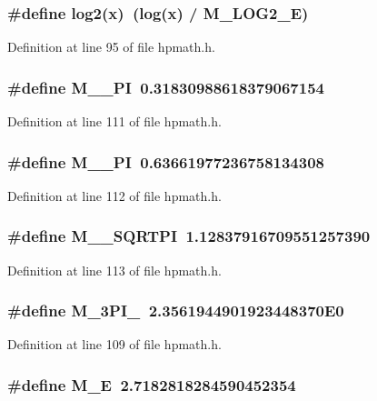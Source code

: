 \subsubsection{\setlength{\rightskip}{0pt plus 5cm}\#define log2(x)\ (log(x) / M\_\-LOG2\_\-E)}\label{hpmath_8h_a8}




Definition at line 95 of file hpmath.h.
\subsubsection{\setlength{\rightskip}{0pt plus 5cm}\#define M\_\_\-PI\ 0.31830988618379067154}\label{hpmath_8h_a21}




Definition at line 111 of file hpmath.h.
\subsubsection{\setlength{\rightskip}{0pt plus 5cm}\#define M\_\_\-PI\ 0.63661977236758134308}\label{hpmath_8h_a22}




Definition at line 112 of file hpmath.h.
\subsubsection{\setlength{\rightskip}{0pt plus 5cm}\#define M\_\_\-SQRTPI\ 1.12837916709551257390}\label{hpmath_8h_a23}




Definition at line 113 of file hpmath.h.
\subsubsection{\setlength{\rightskip}{0pt plus 5cm}\#define M\_\-3PI\_\ 2.3561944901923448370E0}\label{hpmath_8h_a19}




Definition at line 109 of file hpmath.h.
\subsubsection{\setlength{\rightskip}{0pt plus 5cm}\#define M\_\-E\ 2.7182818284590452354}\label{hpmath_8h_a10}




